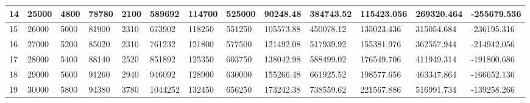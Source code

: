 \begin{table}[]
{\begin{tabular}{|l|l|l|l|l|l|l|l|l|l|l|l|l|}
    14    & 25000     & 4800          & 78780                                                 & 2100                                                           & 589692                                                   & 114700                                                     & 525000                                                          & 90248.48  & 384743.52  & 115423.056    & 269320.464       & -255679.536     \\ \hline
    15    & 26000     & 5000          & 81900                                                 & 2310                                                           & 673902                                                   & 118250                                                     & 551250                                                          & 105573.88 & 450078.12  & 135023.436    & 315054.684       & -236195.316     \\ \hline
    16    & 27000     & 5200          & 85020                                                 & 2310                                                           & 761232                                                   & 121800                                                     & 577500                                                          & 121492.08 & 517939.92  & 155381.976    & 362557.944       & -214942.056     \\ \hline
    17    & 28000     & 5400          & 88140                                                 & 2520                                                           & 851892                                                   & 125350                                                     & 603750                                                          & 138042.98 & 588499.02  & 176549.706    & 411949.314       & -191800.686     \\ \hline
    18    & 29000     & 5600          & 91260                                                 & 2940                                                           & 946092                                                   & 128900                                                     & 630000                                                          & 155266.48 & 661925.52  & 198577.656    & 463347.864       & -166652.136     \\ \hline
    19    & 30000     & 5800          & 94380                                                 & 3780                                                           & 1044252                                                  & 132450                                                     & 656250                                                          & 173242.38 & 738559.62  & 221567.886    & 516991.734       & -139258.266     \\ \hline

\end{tabular}}
\end{table}
